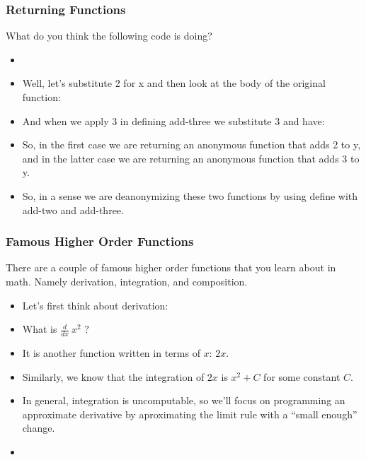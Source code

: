 \documentclass{beamer}
\begin{document}
\begin{frame}
  \frametitle{Returning Functions}
  What do you think the following code is doing?
  \begin{itemize}
  \item<2-> \Factory
  \item<3-> Well, let's substitute 2 for x and then look at the body
    of the original function:
    \SubTwo
  \item<4-> And when we apply 3 in defining add-three we substitute 3
    and have:
    \SubThree
  \item<5-> So, in the first case we are returning an anonymous function
    that adds 2 to y, and in the latter case we are returning an anonymous
    function that adds 3 to y.
  \item<6-> So, in a sense we are deanonymizing these two functions by
    using define with add-two and add-three.
  \end{itemize}
\end{frame}


\begin{frame}
  \frametitle{Famous Higher Order Functions}
  There are a couple of famous higher order functions that you learn
  about in math. Namely derivation, integration, and composition.
  \begin{itemize}
  \item<2-> Let's first think about derivation:
  \item<3-> What is $\frac{d}{dx}~x^2$ ?
  \item<4-> It is another function written in terms of $x$:
    $2x$.
  \item<5-> Similarly, we know that the integration of $2x$ is
    $x^2 + C$ for some constant $C$.
  \item<6-> In general, integration is uncomputable, so we'll focus
    on programming an approximate derivative by aproximating the limit
    rule with a ``small enough'' change.
  \item<7-> \deriv
  \end{itemize}
\end{frame}
\end{document}
